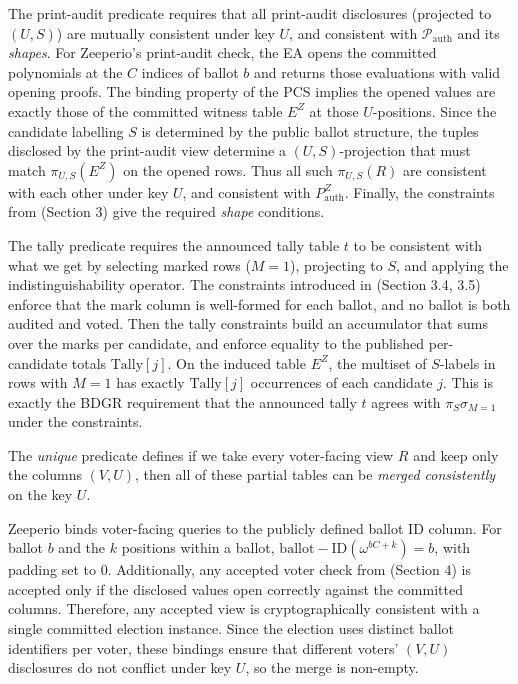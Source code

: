 The print-audit predicate requires that all print-audit disclosures (projected to $(U,S)$) are mutually consistent under key $U$, and consistent with $\mathcal{P}_{\mathrm{auth}}$ and its \emph{shapes}.
For Zeeperio’s print-audit check, the EA opens the committed polynomials at the $C$ indices of ballot $b$ and returns those evaluations with valid opening proofs.
The binding property of the PCS implies the opened values are exactly those of the committed witness table $E^Z$ at those $U$-positions.
Since the candidate labelling $S$ is determined by the public ballot structure, the tuples disclosed by the print-audit view determine a $(U,S)$-projection that must match $\pi_{U,S}(E^Z)$ on the opened rows.
Thus all such $\pi_{U,S}(R)$ are consistent with each other under key $U$, and consistent with $P_{\mathrm{auth}}^{Z}$.
Finally, the constraints from (Section 3) give the required \emph{shape} conditions.


The tally predicate requires the announced tally table $t$ to be consistent with what we get by selecting marked rows ($M=1$), projecting to $S$, and applying the indistinguishability operator.
The constraints introduced in (Section 3.4, 3.5) enforce that the mark column is well-formed for each ballot, and no ballot is both audited and voted.
Then the tally constraints build an accumulator that sums over the marks per candidate, and enforce equality to the published per-candidate totals $\mathrm{Tally}[j]$.
On the induced table $E^Z$, the multiset of $S$-labels in rows with $M=1$ has exactly $\mathrm{Tally}[j]$ occurrences of each candidate $j$.
This is exactly the BDGR requirement that the announced tally $t$ agrees with $\pi_S\sigma_{M=1}$ under the constraints.


The \emph{unique} predicate defines if we take every voter-facing view $R$ and keep only the
columns $(V,U)$, then all of these partial tables can be \emph{merged consistently} on the key $U$.

Zeeperio binds voter-facing queries to the publicly defined ballot ID column.
For ballot $b$ and the $k$ positions within a ballot, $\mathrm{ballot-ID}(\omega^{bC+k})=b$, with padding set to $0$.
Additionally, any accepted voter check from (Section 4) is accepted only if the disclosed values open correctly against the committed columns.
Therefore, any accepted view is cryptographically consistent with a single committed election instance.
Since the election uses distinct ballot identifiers per voter, these bindings ensure that different voters’ $(V,U)$ disclosures do not conflict under key $U$, so the merge is non-empty.

